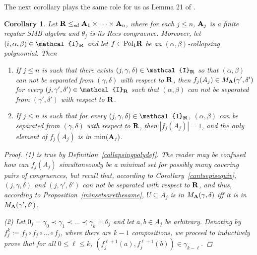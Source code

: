\documentclass[11pt]{amsart}
\newcommand{\m}[1]{{\uppercase {\mathbf {#1}}}}
\newcommand{\vr}[1]{{\uppercase {\mathcal{#1}}}}
\newcommand{\poln}[2]{{\rm Pol_{#1}\m #2}}
\newtheorem{cor}[thm]{Corollary}
\theoremstyle{definition}
\begin{document}
The next corollary plays the same role for us as Lemma 21 of \cite{BuSMB}.

\begin{cor}\label{colltominsingleton}
Let $\m R\leq_{sd}\m a_1\times\dots\times\m a_n$, where for each $j\leq n$, $\m a_j$ is a finite regular SMB algebra and $\theta_j$ is its Rees congruence. Moreover, let $(i,\alpha,\beta)\in \vr i_{\m r}$ and let $f\in \poln{1}{R}$ be an $(\alpha,\beta)$-collapsing polynomial. Then
\begin{enumerate}
\item If $j\leq n$ is such that there exists $(j,\gamma,\delta)\in\vr i_{\m r}$ so that $(\alpha,\beta)$ can not be separated from $(\gamma,\delta)$ with respect to $\m r$, then $f_j(A_j)\in M_{\m a}(\gamma',\delta')$ for every $(j,\gamma',\delta')\in\vr i_{\m r}$ such that $(\alpha,\beta)$ can not be separated from $(\gamma',\delta')$ with respect to $\m r$.

\item If $j\leq n$ is such that for every $(j,\gamma,\delta)\in\vr i_{\m r}$, $(\alpha,\beta)$ can be separated from $(\gamma,\delta)$ with respect to $\m r$, then $|f_j(A_j)|=1$, and the only element of $f_j(A_j)$ is in $\mathrm{min}(\m a_j)$.
\end{enumerate}

\begin{proof}
(1) is true by Definition~\ref{collapsingpolydef}. The reader may be confused how can $f_j(A_j)$ simultaneously be a minimal set for possibly many covering pairs of congruences, but recall that, according to Corollary~\ref{cantsepisequiv}, $(j,\gamma,\delta)$ and $(j,\gamma',\delta')$ can not be separated with respect to $\m r$, and thus, according to Proposition~\ref{minsetsarethesame}, $U\subseteq A_j$ is in $M_{\m a}(\gamma,\delta)$ iff it is in $M_{\m a}(\gamma',\delta')$.

(2) Let $0_j=\gamma_0\prec\gamma_1\prec\dots\prec\gamma_k=\theta_j$ and let $a,b\in A_j$ be arbitrary. Denoting by $f_j^k:=f_j\circ f_j\circ\dots\circ f_j$, where there are $k-1$ compositions, we proceed to inductively prove that for all $0\leq \ell\leq k$, $(f_j^{\ell+1}(a),f_j^{\ell+1}(b))\in\gamma_{k-\ell}$. 


\end{proof}
\end{cor}
\end{document}
